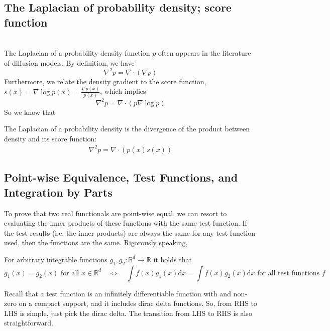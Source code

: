 \documentclass{article}
\begin{document}
\subsection{The Laplacian of probability density; score function}
\ \\ \noindent
The Laplacian of a probability density function $p$ often appears in the literature of diffusion models. By definition, we have
$$
\nabla^2 {p} = \nabla \cdot (\nabla {p})
$$
Furthermore, we relate the density gradient to the score function, 
$s(x)=\nabla \log {p}(x) = \frac{\nabla {p}(x)}{{p}(x)}$, 
which implies 
$$
\nabla^2 {p} = \nabla \cdot \left({p} \nabla \log {p}\right)
$$
So we know that 
\begin{theorem}
The Laplacian of a probability density is the 
divergence of the product between density and its score function:
\begin{equation}
\begin{aligned}\label{eq:laplacian_score}
\nabla^2 {p} =\nabla \cdot (p(x) s(x))
\end{aligned}
\end{equation}
\end{theorem}




\subsection{Point-wise Equivalence, Test Functions, and Integration by Parts}
To prove that two real functionals are point-wise equal, we can resort to evaluating the inner products of these functions with the same test function. If the test results (i.e. the inner products) are always the same for any test function used, then the functions are the same. Rigorously speaking, 
\begin{theorem}
For arbitrary integrable functions $g_1, g_2: \mathbb{R}^d \rightarrow \mathbb{R}$ it holds that
$$
g_1(x)=g_2(x) \text { for all } x \in \mathbb{R}^d \quad \Leftrightarrow \quad \int f(x) g_1(x) \mathrm{d} x=\int f(x) g_2(x) \mathrm{d} x \text { for all test functions } f
$$
\end{theorem}
Recall that a test function is an infinitely differentiable function with and non-zero on a compact support, and it includes dirac delta functions. So, from RHS to LHS is simple, just pick the dirac delta. The transition from LHS to RHS is also straightforward. 
\end{document}
